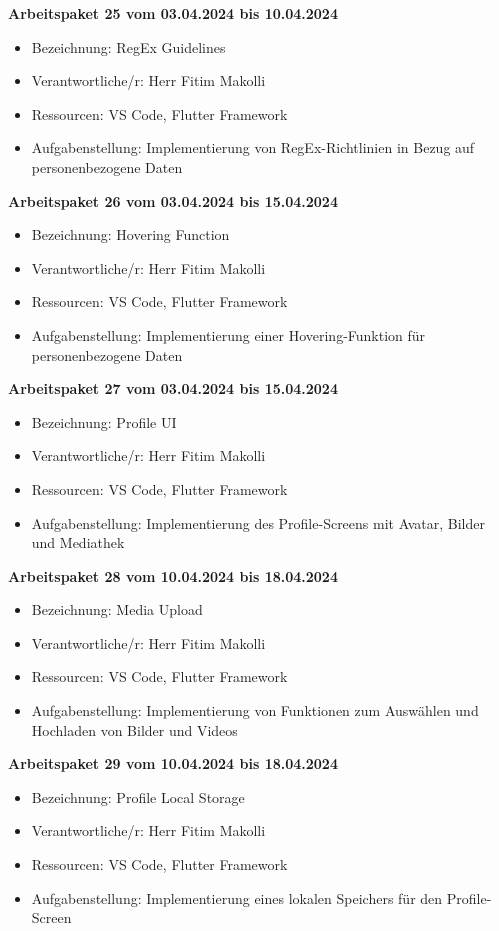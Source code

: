 \textbf{Arbeitspaket 25 vom 03.04.2024 bis 10.04.2024}
\begin{itemize}[itemsep=0pt]
    \item{Bezeichnung: RegEx Guidelines} 
	\item{Verantwortliche/r: Herr Fitim Makolli} 
	\item{Ressourcen: VS Code, Flutter Framework}
    \item{Aufgabenstellung: Implementierung von RegEx-Richtlinien in Bezug auf personenbezogene Daten}
\end{itemize} 

\textbf{Arbeitspaket 26 vom 03.04.2024 bis 15.04.2024}
\begin{itemize}[itemsep=0pt]
    \item{Bezeichnung: Hovering Function} 
	\item{Verantwortliche/r: Herr Fitim Makolli} 
	\item{Ressourcen: VS Code, Flutter Framework}
    \item{Aufgabenstellung: Implementierung einer Hovering-Funktion für personenbezogene Daten} 
\end{itemize}

\textbf{Arbeitspaket 27 vom 03.04.2024 bis 15.04.2024}
\begin{itemize}[itemsep=0pt]
    \item{Bezeichnung: Profile UI} 
	\item{Verantwortliche/r: Herr Fitim Makolli} 
	\item{Ressourcen: VS Code, Flutter Framework} 
    \item{Aufgabenstellung: Implementierung des Profile-Screens mit Avatar, Bilder und Mediathek}
\end{itemize}

\newpage
\textbf{Arbeitspaket 28 vom 10.04.2024 bis 18.04.2024}
\begin{itemize}[itemsep=0pt]
    \item{Bezeichnung: Media Upload} 
	\item{Verantwortliche/r: Herr Fitim Makolli} 
	\item{Ressourcen: VS Code, Flutter Framework} 
    \item{Aufgabenstellung: Implementierung von Funktionen zum Auswählen und Hochladen von Bilder und Videos}
\end{itemize} 

\textbf{Arbeitspaket 29 vom 10.04.2024 bis 18.04.2024}
\begin{itemize}[itemsep=0pt]
    \item{Bezeichnung: Profile Local Storage} 
	\item{Verantwortliche/r: Herr Fitim Makolli} 
	\item{Ressourcen: VS Code, Flutter Framework} 
    \item{Aufgabenstellung: Implementierung eines lokalen Speichers für den Profile-Screen}
\end{itemize}

